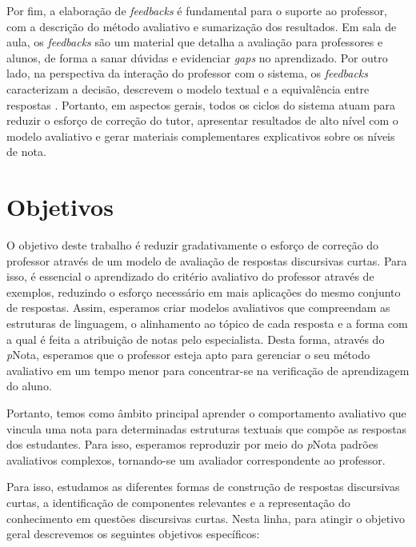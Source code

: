 Por fim, a elaboração de \textit{feedbacks} é fundamental para o suporte ao professor, com a descrição do método avaliativo e sumarização dos resultados. Em sala de aula, os \textit{feedbacks} são um material que detalha a avaliação para professores e alunos, de forma a sanar dúvidas e evidenciar \textit{gaps} no aprendizado. Por outro lado, na perspectiva da interação do professor com o sistema, os \textit{feedbacks} caracterizam a decisão, descrevem o modelo textual e a equivalência entre respostas \cite{bernius2022}. Portanto, em aspectos gerais, todos os ciclos do sistema atuam para reduzir o esforço de correção do tutor, apresentar resultados de alto nível com o modelo avaliativo e gerar materiais complementares explicativos sobre os níveis de nota.

\section{Objetivos} \label{cap1-objetivos}

O objetivo deste trabalho é reduzir gradativamente o esforço de correção do professor através de um modelo de avaliação de respostas discursivas curtas. Para isso, é essencial o aprendizado do critério avaliativo do professor através de exemplos, reduzindo o esforço necessário em mais aplicações do mesmo conjunto de respostas. Assim, esperamos criar modelos avaliativos que compreendam as estruturas de linguagem, o alinhamento ao tópico de cada resposta e a forma com a qual é feita a atribuição de notas pelo especialista. Desta forma, através do \textit{p}Nota, esperamos que o professor esteja apto para gerenciar o seu método avaliativo em um tempo menor para concentrar-se na verificação de aprendizagem do aluno.

Portanto, temos como âmbito principal aprender o comportamento avaliativo que vincula uma nota para determinadas estruturas textuais que compõe as respostas dos estudantes. Para isso, esperamos reproduzir por meio do \textit{p}Nota padrões avaliativos complexos, tornando-se um avaliador correspondente ao professor.

Para isso, estudamos as diferentes formas de construção de respostas discursivas curtas, a identificação de componentes relevantes e a representação do conhecimento em questões discursivas curtas. Nesta linha, para atingir o objetivo geral descrevemos os seguintes objetivos específicos:

